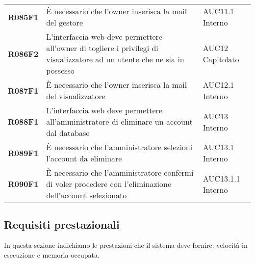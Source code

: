 \documentclass[../analisi-dei-requisiti.tex]{subfiles}
\begin{document}
\begin{center}
\begin{longtable}[H]{>{\centering\bfseries}m{3cm} >{\centering}m{10cm} >{\centering\arraybackslash}m{3cm}}
  R085F1                               & È necessario che l'owner inserisca la mail del gestore                                                                                                                                                  & AUC11.1 Interno               \\
  R086F2                               & L'interfaccia web deve permettere all'owner di togliere i privilegi di visualizzatore ad un utente che ne sia in possesso                                                                               & AUC12 Capitolato              \\
  R087F1                               & È necessario che l'owner inserisca la mail del visualizzatore                                                                                                                                           & AUC12.1 Interno               \\
  R088F1                               & L'interfaccia web deve permettere all'amministratore di eliminare un account dal database                                                                                                               & AUC13 Interno                 \\
  R089F1                               & È necessario che l'amministratore selezioni l'account da eliminare                                                                                                                                      & AUC13.1 Interno               \\
  R090F1                               & È necessario che l'amministratore confermi di voler procedere con l'eliminazione dell'account selezionato                                                                                               & AUC13.1.1 Interno             \\
\end{longtable}
\end{center}

\newpage
\subsection{Requisiti prestazionali}%
\label{sub:requisiti_prestazionali}
In questa sezione indichiamo le prestazioni che il sistema deve fornire: velocità in esecuzione e memoria occupata.
\end{document}
